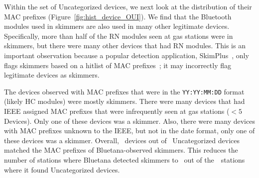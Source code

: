 Within the set of Uncategorized devices, we next look at the distribution of
their MAC prefixes (Figure~\ref{fig:hist_device_OUI}).
%
%
We find that the Bluetooth modules used in skimmers are also used in many other legitimate
devices.
%
Specifically, more than half of the RN modules seen at gas stations were in
skimmers, but there were many other devices that had RN modules.
%
%
%
This is an important observation because a popular detection application,
SkimPlus~\cite{skimplus}, only flags skimmers based on a hitlist of MAC
prefixes~\cite{scaifeoakland}; it may incorrectly flag legitimate devices as
skimmers.

The devices observed with MAC prefixes that were in the \texttt{YY:YY:MM:DD}
format (likely HC modules) were mostly skimmers.
%
There were many devices that had IEEE assigned MAC prefixes that were
infrequently seen at gas stations ($<5$ Devices). Only one of these devices
was a skimmer.
%
Also, there were many devices with MAC prefixes unknown to the IEEE, but not in
the date format, only one of these devices was a skimmer.
%
Overall, \numberBTMACCoDfiltered~devices out of
\numberbtuncategorized~Uncategorized devices matched the MAC prefixes of
Bluetana-observed skimmers.
%
This reduces the number of stations where Bluetana detected skimmers to
\visitedstationsMACCoDfiltered~out of the~\totaluncatstation~stations where it found
Uncategorized devices.

%
%
%
%
%

